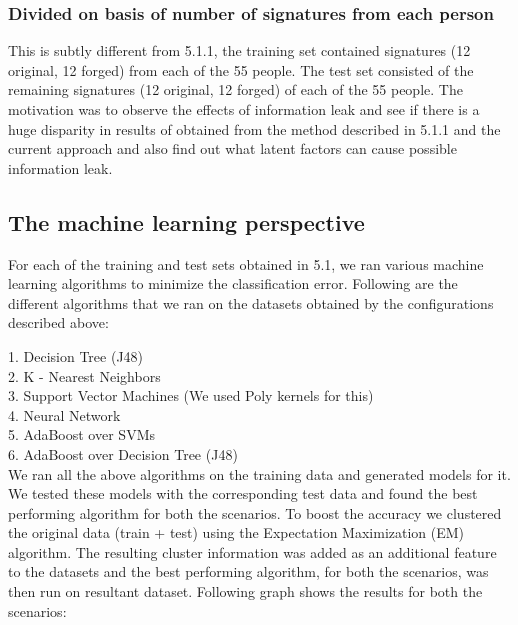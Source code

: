 \documentclass{article}
\begin{document}
\subsubsection{Divided on basis of number of signatures from each person}
This is subtly different from 5.1.1, the training set contained signatures (12 original, 12 forged) from each of the 55 people. The test set consisted of the remaining signatures (12 original, 12 forged) of each of the 55 people. The motivation was to observe the effects of information leak and see if there is a huge disparity in results of obtained from the method described in 5.1.1 and the current approach and also find out what latent factors can cause possible information leak.

\subsection{The machine learning perspective}
For each of the training and test sets obtained in 5.1, we ran various machine learning algorithms to minimize the classification error. Following are the different algorithms that we ran on the datasets obtained by the configurations described above:

1. Decision Tree (J48)\\
2. K - Nearest Neighbors\\
3. Support Vector Machines (We used Poly kernels for this)\\
4. Neural Network\\
5. AdaBoost over SVMs\\
6. AdaBoost over Decision Tree (J48)\\

We ran all the above algorithms on the training data and generated models for it. We tested these models with the corresponding test data and found the best performing algorithm for both the scenarios. To boost the accuracy we clustered the original data (train + test) using the Expectation Maximization (EM) algorithm. The resulting cluster information was added as an additional feature to the datasets and the best performing algorithm, for both the scenarios, was then run on resultant dataset. Following graph shows the results for both the scenarios:
\end{document}
